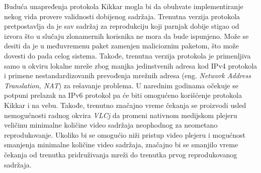 \documentclass[12pt,oneside]{memoir}
\begin{document}
Buduća unapređenja protokola Kikkar mogla bi da obuhvate implementiranje nekog vida provere validnosti dobijenog sadržaja. Trenutna verzija protokola pretpostavlja da je sav sadržaj za reprodukciju koji parnjak dobije stigao od izvora što u slučaju zlonamernih korisnika ne mora da bude ispunjeno. Može se desiti da je u međuvremenu paket zamenjen malicioznim paketom, što može dovesti do pada celog sistema. Takođe, trenutna verzija protokola je primenljiva samo u okviru lokalne mreže zbog manjka jedinstvenih adresa kod IPv4 protokola i primene nestandardizovanih prevođenja mrežnih adresa (eng. \textit{Network Address Translation, NAT}) za rešavanje problema. U narednim godinama očekuje se potpuni prelazak na IPv6 protokol pa će biti omogućeno korišćenje protokola Kikkar i na vebu. Takođe, trenutno značajno vreme čekanja se proizvodi usled nemogućnosti radnog okvira \textit{VLCj} da promeni nativnom medijskom plejeru veličinu minimalne količine video sadržaja neophodnog za neometano reprodukovanje. Ukoliko bi se omogućio niži pristup video plejeru i mogućnost smanjenja minimalne količine video sadržaja, značajno bi se smanjilo vreme čekanja od trenutka pridruživanja mreži do trenutka prvog reprodukovanog sadržaja.
 



\literatura

\backmatter

\end{document}
